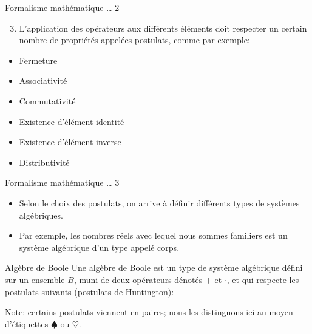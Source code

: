 \documentclass[presentation]{beamer}
\begin{document}
\begin{frame}[label={sec:org0323b95}]{Formalisme mathématique \ldots{} 2}
\begin{enumerate}
\setcounter{enumi}{2}
\item L'application des opérateurs aux différents éléments doit respecter un certain nombre de propriétés appelées postulats, comme par exemple:
\end{enumerate}
\begin{itemize}
\item Fermeture

\item Associativité

\item Commutativité

\item Existence d'élément identité

\item Existence d'élément inverse

\item Distributivité
\end{itemize}
\end{frame}

\begin{frame}[label={sec:org9524bf9}]{Formalisme mathématique \ldots{} 3}
\begin{itemize}
\item Selon le choix des postulats, on arrive à définir différents types de systèmes algébriques.

\item Par exemple, les nombres réels avec lequel nous sommes familiers est un système algébrique d'un type appelé \alert{corps}.
\end{itemize}
\end{frame}

\begin{frame}[label={sec:orge0af91f}]{Algèbre de Boole}
Une algèbre de Boole est un type de système algébrique défini sur un
ensemble \(B\), muni de deux opérateurs dénotés \(+\) et \(\cdot\), et qui
respecte les postulats suivants (postulats de Huntington):

Note: certains postulats viennent en paires; nous les distinguons ici au
moyen d'étiquettes \(\spadesuit\) ou \(\heartsuit\).
\end{frame}
\end{document}
